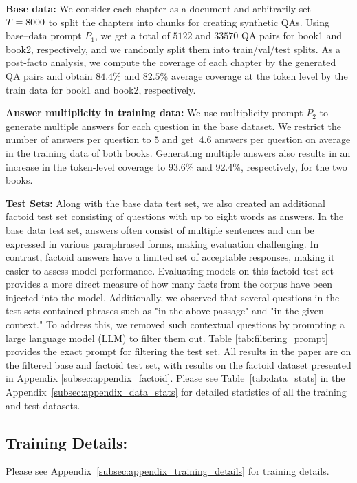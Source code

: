 \noindent \textbf{Base data:}
We consider each chapter as a document and arbitrarily set $T= 8000$ to split the chapters into chunks for creating synthetic QAs. 
Using base--data prompt $P_1$, we get a total of $5122$ and $33570$ QA pairs for book1 and book2, respectively, and we randomly split them into train/val/test splits. As a post-facto analysis, we compute the coverage of each chapter by the generated QA pairs and obtain $84.4\%$ and $82.5\%$ average coverage at the token level by the train data for book1 and book2, respectively. 

\noindent \textbf{Answer multiplicity in training data:}
We use multiplicity prompt $P_2$ to generate multiple answers for each question in the base dataset. We restrict the number of answers per question to $5$ and get $~4.6$ answers per question on average in the training data of both books. Generating multiple answers also results in an increase in the token-level coverage to 93.6\% and 92.4\%, respectively, for the two books. 

\noindent \textbf{Test Sets:} Along with the base data test set, we also created an additional factoid test set consisting of questions with up to eight words as answers. In the base data test set, answers often consist of multiple sentences and can be expressed in various paraphrased forms, making evaluation challenging. In contrast, factoid answers have a limited set of acceptable responses, making it easier to assess model performance. Evaluating models on this factoid test set provides a more direct measure of how many facts from the corpus have been injected into the model.
Additionally, we observed that several questions in the test sets contained phrases such as "in the above passage" and "in the given context." To address this, we removed such contextual questions by prompting a large language model (LLM) to filter them out. Table \ref{tab:filtering_prompt} provides the exact prompt for filtering the test set. All results in the paper are on the filtered base and factoid test set, with results on the factoid dataset presented in Appendix \ref{subsec:appendix_factoid}. Please see Table~\ref{tab:data_stats} in the Appendix~\ref{subsec:appendix_data_stats} for detailed statistics of all the training and test datasets.

\subsection{Training Details:}
Please see Appendix~\ref{subsec:appendix_training_details} for training details.

